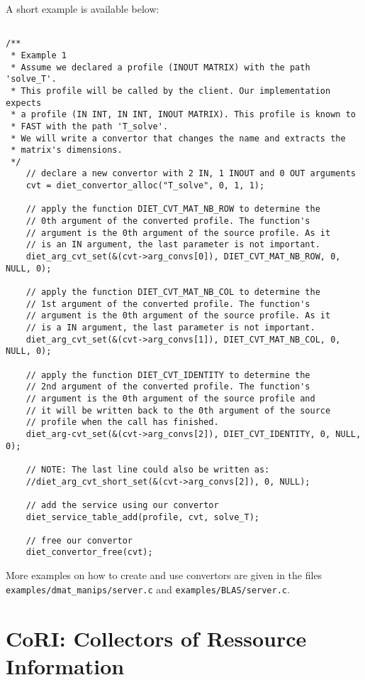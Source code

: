 \noindent A short example is available below:
\footnotesize
\begin{verbatim}

/**
 * Example 1
 * Assume we declared a profile (INOUT MATRIX) with the path 'solve_T'.
 * This profile will be called by the client. Our implementation expects
 * a profile (IN INT, IN INT, INOUT MATRIX). This profile is known to
 * FAST with the path 'T_solve'.
 * We will write a convertor that changes the name and extracts the
 * matrix's dimensions.
 */
    // declare a new convertor with 2 IN, 1 INOUT and 0 OUT arguments
    cvt = diet_convertor_alloc("T_solve", 0, 1, 1);

    // apply the function DIET_CVT_MAT_NB_ROW to determine the
    // 0th argument of the converted profile. The function's
    // argument is the 0th argument of the source profile. As it
    // is an IN argument, the last parameter is not important.
    diet_arg_cvt_set(&(cvt->arg_convs[0]), DIET_CVT_MAT_NB_ROW, 0, NULL, 0);

    // apply the function DIET_CVT_MAT_NB_COL to determine the
    // 1st argument of the converted profile. The function's
    // argument is the 0th argument of the source profile. As it
    // is a IN argument, the last parameter is not important.
    diet_arg_cvt_set(&(cvt->arg_convs[1]), DIET_CVT_MAT_NB_COL, 0, NULL, 0);

    // apply the function DIET_CVT_IDENTITY to determine the
    // 2nd argument of the converted profile. The function's
    // argument is the 0th argument of the source profile and
    // it will be written back to the 0th argument of the source
    // profile when the call has finished.
    diet_arg-cvt_set(&(cvt->arg_convs[2]), DIET_CVT_IDENTITY, 0, NULL, 0);

    // NOTE: The last line could also be written as:
    //diet_arg_cvt_short_set(&(cvt->arg_convs[2]), 0, NULL);

    // add the service using our convertor
    diet_service_table_add(profile, cvt, solve_T);

    // free our convertor
    diet_convertor_free(cvt);
\end{verbatim}
\normalsize

\noindent More examples on how to create and use convertors are given in the
files \\
\texttt{examples/dmat\_manips/server.c} and \texttt{examples/BLAS/server.c}.

\section{CoRI: Collectors of Ressource Information}
\label{sec:CORI}

